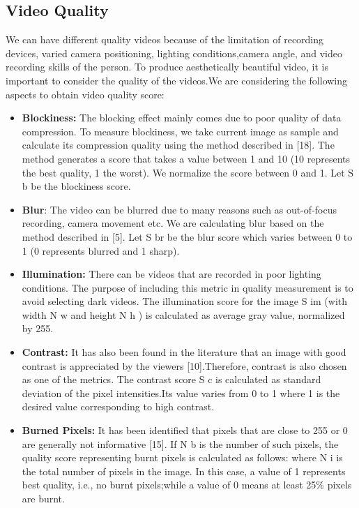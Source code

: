 \documentclass{sig-alternate}
\begin{document}
\subsection{Video Quality}
We can have different quality videos because of the limitation of recording devices, varied camera positioning, lighting conditions,camera angle, and video recording skills of the person. To produce aesthetically beautiful video, it is important to consider the quality of the videos.We are considering the following aspects to obtain
video quality score:
\begin{itemize}
    \item \textbf{Blockiness:} The blocking effect mainly comes due to poor quality of data compression. To measure blockiness, we take current image as sample and calculate its compression quality using the method described in [18]. The method generates a score that takes a value between 1 and 10 (10 represents the best quality, 1 the worst). We normalize the score between 0 and 1. Let S b be the blockiness score.
    \item \textbf{Blur}: The video can be blurred due to many reasons such as out-of-focus recording, camera movement etc. We are calculating blur based on the method described in [5]. Let S br be the blur score which varies between 0 to 1 (0 represents blurred and 1 sharp).
    \item \textbf{Illumination:} There can be videos that are recorded in poor lighting conditions. The purpose of including this metric in quality measurement is to avoid selecting dark videos. The illumination score for the image S im (with width N w and height N h ) is calculated as average gray value, normalized by 255.
    \item \textbf{Contrast:} It has also been found in the literature that an image with good contrast is appreciated by the viewers [10].Therefore, contrast is also chosen as one of the metrics. The contrast score S c is calculated as standard deviation of the pixel intensities.Its value varies from 0 to 1 where 1 is the desired value corresponding to high contrast.
    \item \textbf{Burned Pixels:} It has been identified that pixels that are close to 255 or 0 are generally not informative [15]. If N b is the number of such pixels, the quality score representing burnt pixels is calculated as follows:
    where N i is the total number of pixels in the image. In this case, a value of 1 represents best quality, i.e., no burnt pixels;while a value of 0 means at least 25\% pixels are burnt.
\end{itemize}
\end{document}
